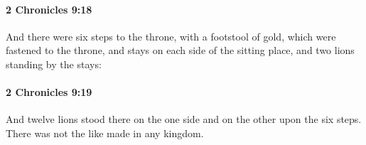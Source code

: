 		\paragraph{2 Chronicles 9:18} %
			\label{2CHRONICLES-9-18}

			And there were six steps to the throne, with a footstool of gold, which were fastened to the throne, and stays on each side of the sitting place, and two lions standing by the stays:


		\paragraph{2 Chronicles 9:19} %
			\label{2CHRONICLES-9-19}

			And twelve lions stood there on the one side and on the other upon the six steps. There was not the like made in any kingdom.


